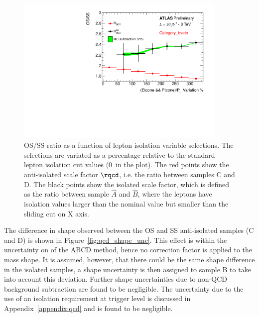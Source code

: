 \begin{figure}[tp]
	\begin{center}
	\includegraphics[page=5,width=0.9\textwidth]{figure/QCD/qcd_plot.pdf}
	\end{center}
	\caption{OS/SS ratio as a function of lepton isolation variable selections. The selections are variated as a percentage relative to
	the standard lepton isolation cut values (0~in the plot). 
	The red points show the anti-isolated scale factor $\rqcd$, i.e. the ratio between samples C and D.
	 The black points show the isolated scale factor, which is defined as the ratio between sample $\hat{A}$ and $\hat{B}$, 
	 where the leptons have isolation values larger than the nominal value but smaller
	 than the sliding cut on X axis.
	 }
	\label{fig:os_ss_ratio}
\end{figure}

The difference in \mmc shape observed between the OS and SS anti-isolated samples (C and D) is shown in Figure~\ref{fig:qcd_shape_unc}.
This effect is within the  uncertainty on \rqcd of the ABCD method, hence no correction factor is applied to the mass shape. 
It is assumed, however, that there could be the same 
shape difference in the isolated samples, a shape uncertainty is then assigned to sample B to take into account this  deviation. Further 
shape uncertainties due to non-QCD background subtraction are found to be negligible. The uncertainty due to the use of an isolation 
requirement at trigger level is discussed in Appendix~\ref{appendix:qcd} and is found to be negligible.


